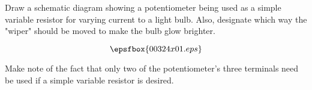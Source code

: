 

Draw a schematic diagram showing a potentiometer being used as a simple variable resistor for varying current to a light bulb.  Also, designate which way the "wiper" should be moved to make the bulb glow brighter.







$$\epsfbox{00324x01.eps}$$







Make note of the fact that only two of the potentiometer's three terminals need be used if a simple variable resistor is desired.




